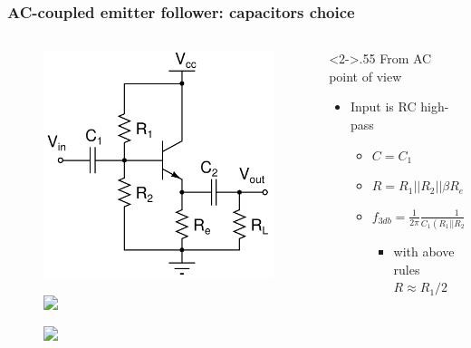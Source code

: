 \documentclass[beamer]{standalone}
\begin{document}
\frame
{ \frametitle{AC-coupled emitter follower: capacitors choice}
\begin{columns}[t]
	\begin{column}{.45\textwidth}
		\vskip -0.4in
		\begin{figure}
			\includegraphics[height=0.40\textheight]{./schematics/npn_ac_emitter_follower}
		\end{figure}
		\vskip -0.3in
		\begin{figure}
			\includegraphics<2->[height=0.20\textheight]{./schematics/ac_coupled_input}
		\end{figure}
		\vskip -0.3in
		\begin{figure}
			\includegraphics<3->[height=0.20\textheight]{./schematics/ac_coupled_output}
		\end{figure}
	\end{column}
	\begin{column}<2->{.55\textwidth}
		From AC point of view
		\begin{itemize}
			\item<2-> Input is RC high-pass
				\begin{itemize}
					\item $C=C_1$
					\item $R=R_1||R_2||\beta R_e$
					\item $f_{3db}=\frac{1}{2 \pi} \frac{1}{C_1 (R_1||R_2||\beta R_e)}$
						\begin{itemize}
							\item with above rules $R \approx R_1/2$

\end{itemize}
\end{itemize}
\end{itemize}
\end{column}
\end{columns}}
\end{document}
